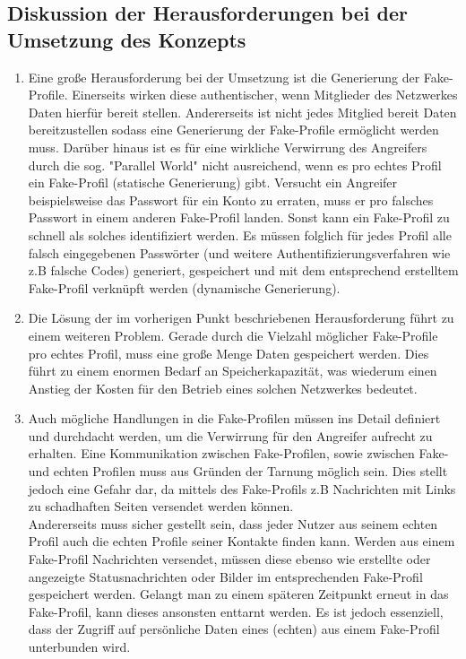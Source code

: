 \documentclass{sigchi}
\begin{document}
\subsection{Diskussion der Herausforderungen bei der Umsetzung des Konzepts}
\label{Diskussion}

\begin{enumerate}
	\item Eine große Herausforderung bei der Umsetzung ist die Generierung der Fake-Profile. Einerseits wirken diese authentischer, wenn Mitglieder des Netzwerkes Daten hierfür bereit stellen. Andererseits ist nicht jedes Mitglied bereit Daten bereitzustellen sodass eine Generierung der Fake-Profile ermöglicht werden muss. Darüber hinaus ist es für eine wirkliche Verwirrung des Angreifers durch die sog. "Parallel World" nicht ausreichend, wenn es pro echtes Profil ein Fake-Profil (statische Generierung) gibt. Versucht ein Angreifer beispielsweise das Passwort für ein Konto zu erraten, muss er pro falsches Passwort in einem anderen Fake-Profil landen. Sonst kann ein Fake-Profil zu schnell als solches identifiziert werden. Es müssen folglich für jedes Profil alle falsch eingegebenen Passwörter (und weitere Authentifizierungsverfahren wie z.B falsche Codes) generiert, gespeichert und mit dem entsprechend erstelltem Fake-Profil verknüpft werden (dynamische Generierung).
	\item Die Lösung der im vorherigen Punkt beschriebenen Herausforderung führt zu einem weiteren Problem. Gerade durch die Vielzahl möglicher Fake-Profile pro echtes Profil, muss eine große Menge Daten gespeichert werden. Dies führt zu einem enormen Bedarf an Speicherkapazität, was wiederum einen Anstieg der Kosten für den Betrieb eines solchen Netzwerkes bedeutet. 
	\item Auch mögliche Handlungen in die Fake-Profilen müssen ins Detail definiert und durchdacht werden, um die Verwirrung für den Angreifer aufrecht zu erhalten. Eine Kommunikation zwischen Fake-Profilen, sowie zwischen Fake- und echten Profilen muss aus Gründen der Tarnung möglich sein. Dies stellt jedoch eine Gefahr dar, da mittels des Fake-Profils z.B Nachrichten mit Links zu schadhaften Seiten versendet werden können.\\ Andererseits muss sicher gestellt sein, dass jeder Nutzer aus seinem echten Profil auch die echten Profile seiner Kontakte finden kann. Werden aus einem Fake-Profil Nachrichten versendet, müssen diese ebenso wie erstellte oder angezeigte Statusnachrichten oder Bilder im entsprechenden Fake-Profil gespeichert werden. Gelangt man zu einem späteren Zeitpunkt erneut in das Fake-Profil, kann dieses ansonsten enttarnt werden. Es ist jedoch essenziell, dass der Zugriff auf persönliche Daten eines (echten) aus einem Fake-Profil unterbunden wird.

\end{enumerate}
\end{document}

